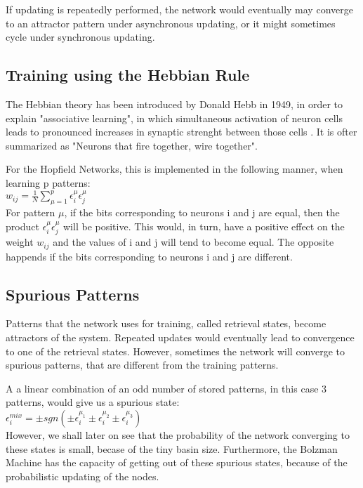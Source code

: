 If updating is repeatedly performed, the network would eventually may converge to an attractor pattern under asynchronous updating, or it might sometimes cycle under synchronous updating. 

\subsection{Training using the Hebbian Rule}

The Hebbian theory has been introduced by Donald Hebb in 1949, in order to explain "associative learning", in which simultaneous activation of neuron cells leads to pronounced increases in synaptic strenght between those cells \cite{hebb_wiki}. It is ofter summarized as "Neurons that fire together, wire together". 

For the Hopfield Networks, this is implemented in the following manner, when learning p patterns:\\

\( w_{ij}=\frac{1}{N}\sum_{\mu=1}^{p}\epsilon_{i}^\mu \epsilon_{j}^\mu \)\\

For pattern \(\mu\), if the bits corresponding to neurons i and j are equal, then the product  \( \epsilon_{i}^\mu \epsilon_{j}^\mu \) will be positive. This would, in turn, have a positive effect on the weight \(w_{ij} \) and the values of i and j will tend to become equal. The opposite happends if the bits corresponding to neurons i and j are different.

\subsection{Spurious Patterns}

Patterns that the network uses for training, called retrieval states, become attractors of the system. Repeated updates would eventually lead to convergence to one of the retrieval states. However, sometimes the network will converge to spurious patterns, that are different from the training patterns. 

A a linear combination of an odd number of stored patterns, in this case 3 patterns, would give us a spurious state:\\

\( \epsilon_{i}^{mix} = \pm sgn(\pm \epsilon_{i}^{\mu_{1}} 
			       \pm \epsilon_{i}^{\mu_{2}}
			       \pm \epsilon_{i}^{\mu_{3}}) \)\\

However, we shall later on see that the probability of the network converging to these states is small, becase of the tiny basin size. Furthermore, the Bolzman Machine has the capacity of getting out of these spurious states, because of the probabilistic updating of the nodes.			       

